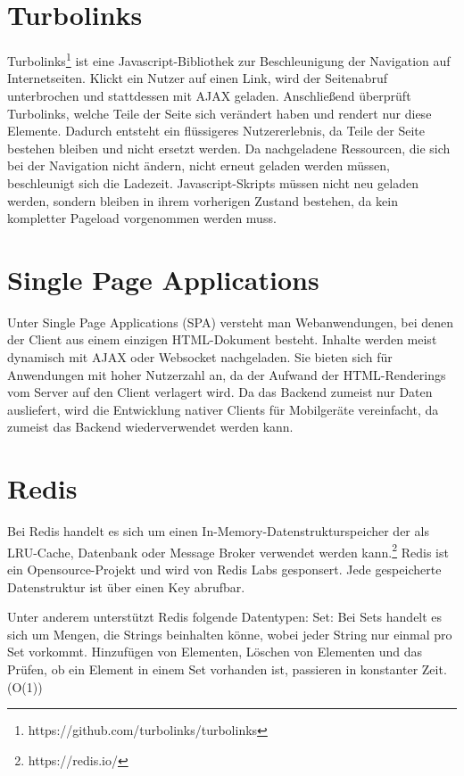 \section{Turbolinks}
Turbolinks\footnote{https://github.com/turbolinks/turbolinks} ist eine Javascript-Bibliothek zur Beschleunigung der Navigation auf Internetseiten. Klickt ein Nutzer auf einen Link, wird der Seitenabruf unterbrochen und stattdessen mit AJAX geladen. Anschließend überprüft Turbolinks, welche Teile der Seite sich verändert haben und rendert nur diese Elemente. Dadurch entsteht ein flüssigeres Nutzererlebnis, da Teile der Seite bestehen bleiben und nicht ersetzt werden. Da nachgeladene Ressourcen, die sich bei der Navigation nicht ändern, nicht erneut geladen werden müssen, beschleunigt sich die Ladezeit. Javascript-Skripts müssen nicht neu geladen werden, sondern bleiben in ihrem vorherigen Zustand bestehen, da kein kompletter Pageload vorgenommen werden muss.

\section{Single Page Applications}

Unter Single Page Applications (SPA) versteht man Webanwendungen, bei denen der Client aus einem einzigen HTML-Dokument besteht.\cite{spa-def} Inhalte werden meist dynamisch mit AJAX oder Websocket nachgeladen. Sie bieten sich für Anwendungen mit hoher Nutzerzahl an, da der Aufwand der HTML-Renderings vom Server auf den Client verlagert wird. Da das Backend zumeist nur Daten ausliefert, wird die Entwicklung nativer Clients für Mobilgeräte vereinfacht, da zumeist das Backend wiederverwendet werden kann.

\section{Redis}
Bei Redis handelt es sich um einen In-Memory-Datenstrukturspeicher der als LRU-Cache, Datenbank oder Message Broker verwendet werden kann.\footnote{https://redis.io/} Redis ist ein Opensource-Projekt und  wird von Redis Labs gesponsert. Jede gespeicherte Datenstruktur ist über einen Key abrufbar.

Unter anderem unterstützt Redis folgende Datentypen:
Set:
Bei Sets handelt es sich um Mengen, die Strings beinhalten könne, wobei jeder String nur einmal pro Set vorkommt. Hinzufügen von Elementen, Löschen von Elementen und das Prüfen, ob ein Element in einem Set vorhanden ist, passieren in konstanter Zeit. (O(1))\cite{redis-set}


